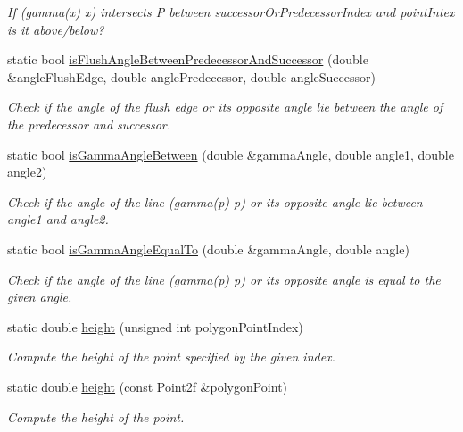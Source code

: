 \begin{DoxyCompactItemize}
\begin{DoxyCompactList}\small\item\em If (gamma(x) x) intersects P between successor\-Or\-Predecessor\-Index and point\-Intex is it above/below? \end{DoxyCompactList}\item 
static bool \hyperlink{classmultiscale_1_1MinimumAreaEnclosingTriangle_abaa5d01dc1a1b2693b4436f19dcb661a}{is\-Flush\-Angle\-Between\-Predecessor\-And\-Successor} (double \&angle\-Flush\-Edge, double angle\-Predecessor, double angle\-Successor)
\begin{DoxyCompactList}\small\item\em Check if the angle of the flush edge or its opposite angle lie between the angle of the predecessor and successor. \end{DoxyCompactList}\item 
static bool \hyperlink{classmultiscale_1_1MinimumAreaEnclosingTriangle_a2f6d0472387e94586f8c5bc5cad604cb}{is\-Gamma\-Angle\-Between} (double \&gamma\-Angle, double angle1, double angle2)
\begin{DoxyCompactList}\small\item\em Check if the angle of the line (gamma(p) p) or its opposite angle lie between angle1 and angle2. \end{DoxyCompactList}\item 
static bool \hyperlink{classmultiscale_1_1MinimumAreaEnclosingTriangle_aa50cf3fffb241c6e3af2c05c9d315321}{is\-Gamma\-Angle\-Equal\-To} (double \&gamma\-Angle, double angle)
\begin{DoxyCompactList}\small\item\em Check if the angle of the line (gamma(p) p) or its opposite angle is equal to the given angle. \end{DoxyCompactList}\item 
static double \hyperlink{classmultiscale_1_1MinimumAreaEnclosingTriangle_a2fb97bef9404c59d5a8ed1eff131b0ce}{height} (unsigned int polygon\-Point\-Index)
\begin{DoxyCompactList}\small\item\em Compute the height of the point specified by the given index. \end{DoxyCompactList}\item 
static double \hyperlink{classmultiscale_1_1MinimumAreaEnclosingTriangle_a0095334b480ad158991cf451a30c3674}{height} (const Point2f \&polygon\-Point)
\begin{DoxyCompactList}\small\item\em Compute the height of the point. \end{DoxyCompactList}\item 

\end{DoxyCompactItemize}
